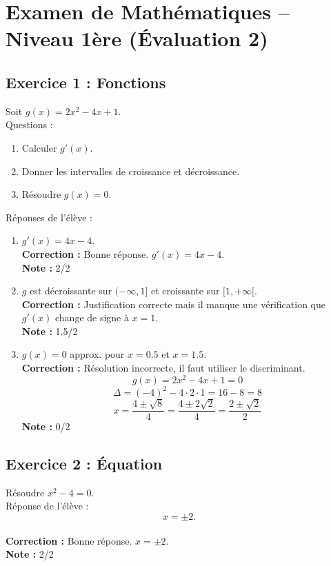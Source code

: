 \documentclass{article}
\begin{document}
\section*{Examen de Mathématiques – Niveau 1ère (Évaluation 2)}

\subsection*{Exercice 1 : Fonctions}
Soit \( g(x) = 2x^2 - 4x + 1 \). \\
Questions : 
\begin{enumerate}
    \item[a)] Calculer \( g'(x) \).
    \item[b)] Donner les intervalles de croissance et décroissance.
    \item[c)] Résoudre \( g(x) = 0 \).
\end{enumerate}
Réponses de l’élève :
\begin{enumerate}
    \item[a)] \( g'(x) = 4x - 4 \). \\
    \textbf{Correction :} Bonne réponse. \( g'(x) = 4x - 4 \). \\
    \textbf{Note :} 2/2
    \item[b)] \( g \) est décroissante sur \((- \infty, 1]\) et croissante sur \([1, +\infty[\). \\
    \textbf{Correction :} Justification correcte mais il manque une vérification que \( g'(x) \) change de signe à \( x = 1 \). \\
    \textbf{Note :} 1.5/2
    \item[c)] \( g(x) = 0 \) approx. pour \( x = 0.5 \) et \( x = 1.5 \). \\
    \textbf{Correction :} Résolution incorrecte, il faut utiliser le discriminant. \\
    \[ g(x) = 2x^2 - 4x + 1 = 0 \]
    \[ \Delta = (-4)^2 - 4 \cdot 2 \cdot 1 = 16 - 8 = 8 \]
    \[ x = \frac{4 \pm \sqrt{8}}{4} = \frac{4 \pm 2\sqrt{2}}{4} = \frac{2 \pm \sqrt{2}}{2} \]
    \textbf{Note :} 0/2
\end{enumerate}

\subsection*{Exercice 2 : Équation}
Résoudre \( x^2 - 4 = 0 \). \\
Réponse de l’élève : 
\[
x = \pm 2.
\] \\
\textbf{Correction :} Bonne réponse. \( x = \pm 2 \). \\
\textbf{Note :} 2/2
\end{document}
